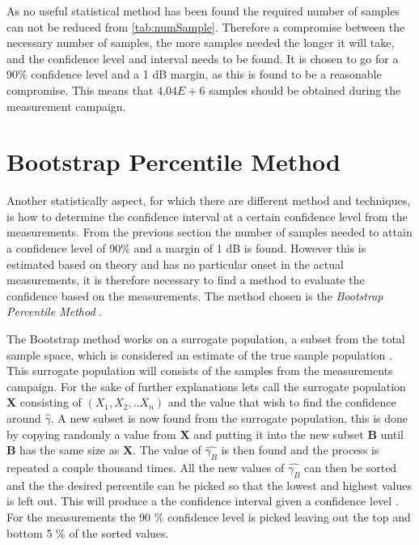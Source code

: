 As no useful statistical method has been found the required number of samples can not be reduced from \autoref{tab:numSample}. Therefore a compromise between the necessary number of samples, the more samples needed the longer it will take, and the confidence level and interval needs to be found. It is chosen to go for a 90\% confidence level and a 1 dB margin, as this is found to be a reasonable compromise. This means that $4.04E+6$ samples should be obtained during the measurement campaign. 


\section{Bootstrap Percentile Method}\label{sec_bootstrap}
Another statistically aspect, for which there are different method and techniques, is how to determine the confidence interval at a certain confidence level from the measurements. From the previous section the number of samples needed to attain a confidence level of 90\% and a margin of 1 dB is found. However this is estimated based on theory and has no particular onset in the actual measurements, it is therefore necessary to find a method to evaluate the confidence based on the measurements. The method chosen is the \textit{Bootstrap Percentile Method} \citep{Bootstrap}.

The Bootstrap method works on a surrogate population, a subset from the total sample space, which is considered an estimate of the true sample population \citep{Bootstrap}. This surrogate population will consists of the samples from the measurements campaign. For the sake of further explanations lets call the surrogate population $\mathbf{X}$ consisting of $(X_1, X_2,..X_n)$ and the value that wish to find the confidence around $\hat{\gamma}$. A new subset is now found from the surrogate population, this is done by copying randomly a value from $\mathbf{X}$ and putting it into the new subset $\mathbf{B}$ until $\mathbf{B}$ has the same size as $\mathbf{X}$. The value of $\hat{\gamma_B}$ is then found and the process is repeated a couple thousand times. All the new values of $\hat{\gamma_B}$ can then be sorted and the the desired percentile can be picked so that the lowest and highest values is left out. This will produce a the confidence interval given a confidence level \citep{Bootstrap}. For the measurements the 90 \% confidence level is picked leaving out the top and bottom 5 \% of the sorted values.

